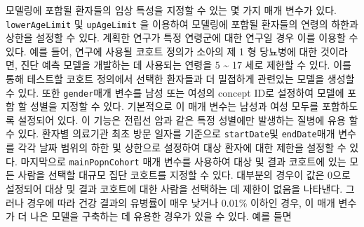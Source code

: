 \documentclass[10.5pt]{book}
\theoremstyle{definition}
\theoremstyle{definition}
\theoremstyle{definition}
\theoremstyle{remark}
\begin{document}
모델링에 포함될 환자들의 임상 특성을 지정할 수 있는 몇 가지 매개 변수가
있다. \texttt{lowerAgeLimit} 및 \texttt{upAgeLimit} 을 이용하여 모델링에
포함될 환자들의 연령의 하한과 상한을 설정할 수 있다. 계획한 연구가 특정
연령군에 대한 연구일 경우 이를 이용할 수 있다. 예를 들어, 연구에 사용될
코호트 정의가 소아의 제 1 형 당뇨병에 대한 것이라면, 진단 예측 모델을
개발하는 데 사용되는 연령을 5 \textasciitilde{} 17 세로 제한할 수 있다.
이를 통해 테스트할 코호트 정의에서 선택한 환자들과 더 밀접하게 관련있는
모델을 생성할 수 있다. 또한 \texttt{gender}매개 변수를 남성 또는 여성의
concept ID로 설정하여 모델에 포함 할 성별을 지정할 수 있다. 기본적으로
이 매개 변수는 남성과 여성 모두를 포함하도록 설정되어 있다. 이 기능은
전립선 암과 같은 특정 성별에만 발생하는 질병에 유용 할 수 있다. 환자별
의료기관 최초 방문 일자를 기준으로 \texttt{startDate}및
\texttt{endDate}매개 변수를 각각 날짜 범위의 하한 및 상한으로 설정하여
대상 환자에 대한 제한을 설정할 수 있다. 마지막으로
\texttt{mainPopnCohort} 매개 변수를 사용하여 대상 및 결과 코호트에 있는
모든 사람을 선택할 대규모 집단 코호트를 지정할 수 있다. 대부분의 경우이
값은 0으로 설정되어 대상 및 결과 코호트에 대한 사람을 선택하는 데 제한이
없음을 나타낸다. 그러나 경우에 따라 건강 결과의 유병률이 매우 낮거나
0.01\% 이하인 경우, 이 매개 변수가 더 나은 모델을 구축하는 데 유용한
경우가 있을 수 있다. 예를 들면
\end{document}
